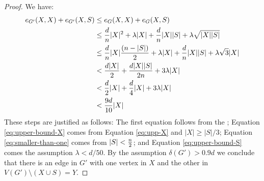 \documentclass[11pt]{article}
\begin{document}
\begin{proof}
We have: 
\begin{align}
\CutEdges{X}{X}{G'} + \CutEdges{X}{S}{G'} &\le \CutEdges{X}{X}{G} + \CutEdges{X}{S}{G} \nonumber \\
   &\le \frac{d}{n}|X|^2 + \lambda |X| + \frac{d}{n}|X||S| + \lambda\sqrt{|X||S|}        \\
&\le \frac{d}{n} |X| \frac{(n-|S|)}{2} + \lambda |X| + \frac{d}{n}|X||S| + \lambda\sqrt{3} |X| \label{eq:upper-bound-X}  \\
&< \frac{d|X|}{2} + \frac{d|X||S|}{2n} + 3 \lambda |X|\\
&< \frac{d}{2}|X| + \frac{d}{4}|X| + 3 \lambda |X| \label{eq:smaller-than-one} \\
&< \cTilde|X|  \label{eq:upper-bound-S}
\end{align}
These steps are justified as follows: The first equation follows from the ; Equation \eqref{eq:upper-bound-X} comes from Equation \eqref{eq:upp-X} and $|X| \ge |S|/3$;
Equation \eqref{eq:smaller-than-one} comes from $\Size{S} < \frac{n}{2}$; and  Equation \eqref{eq:upper-bound-S} comes the assumption $\lambda < d/50$.
By the assumption $\delta(G') > 0.9d$ we conclude that there is an edge in $G'$ with one vertex in $X$ and the other in $V(G') \setminus (X \cup S) = Y$.
\end{proof}
\end{document}
